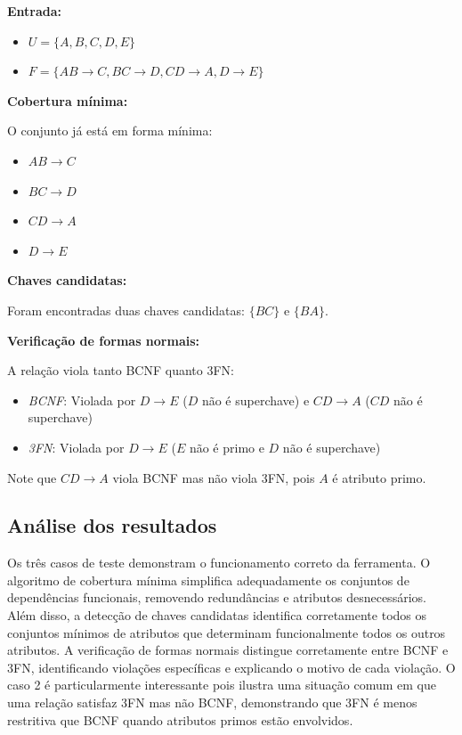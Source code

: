 \documentclass{article}
\begin{document}
\textbf{Entrada:}
\begin{itemize}
    \item $ U = \{A, B, C, D, E\} $
    \item $ F = \{AB \rightarrow C, BC \rightarrow D, CD \rightarrow A, D \rightarrow E\} $
\end{itemize}

\textbf{Cobertura mínima:}

O conjunto já está em forma mínima:
\begin{itemize}
    \item $ AB \rightarrow C $
    \item $ BC \rightarrow D $
    \item $ CD \rightarrow A $
    \item $ D \rightarrow E $
\end{itemize}

\textbf{Chaves candidatas:}

Foram encontradas duas chaves candidatas: $ \{BC\} $ e $ \{BA\} $.

\textbf{Verificação de formas normais:}

A relação viola tanto BCNF quanto 3FN:
\begin{itemize}
    \item \textit{BCNF}: Violada por $ D \rightarrow E $ ($ D $ não é superchave) e $ CD \rightarrow A $ ($ CD $ não é superchave)
    \item \textit{3FN}: Violada por $ D \rightarrow E $ ($ E $ não é primo e $ D $ não é superchave)
\end{itemize}

Note que $ CD \rightarrow A $ viola BCNF mas não viola 3FN, pois $ A $ é atributo primo.

\subsection{Análise dos resultados}

Os três casos de teste demonstram o funcionamento correto da ferramenta. O algoritmo de cobertura mínima simplifica adequadamente os conjuntos de dependências funcionais, removendo redundâncias e atributos desnecessários. Além disso, a detecção de chaves candidatas identifica corretamente todos os conjuntos mínimos de atributos que determinam funcionalmente todos os outros atributos. A verificação de formas normais distingue corretamente entre BCNF e 3FN, identificando violações específicas e explicando o motivo de cada violação. O caso 2 é particularmente interessante pois ilustra uma situação comum em que uma relação satisfaz 3FN mas não BCNF, demonstrando que 3FN é menos restritiva que BCNF quando atributos primos estão envolvidos.
\end{document}
